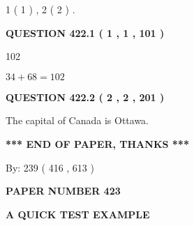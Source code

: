 \documentclass[12pt]{article}
\begin{document}
   
   1 ( 1 )
 ,
   2 ( 2 )
 .
  
\vspace{0.2in}
  
{\textbf{\Large{QUESTION
422.1 
 ( 1 , 1 , 101 )
}}}
  
  
 
 
\noindent{}

102
 
 
 
 
\noindent{}

$ %
34 +  %
68=   %
102$
 
 
  
\vspace{0.2in}
  
{\textbf{\Large{QUESTION
422.2 
 ( 2 , 2 , 201 )
}}}
  
  
 
 
\noindent{}
 
 
The capital of Canada is Ottawa.
 
 
 
 
   
   
 \vspace{0.2in}
 
   
   
   
   
\vspace{1.0in} 
{\textbf{\large{ *** END OF PAPER, THANKS *** }}} 
   
   
\hspace{1.0in} By: 
 239 ( 416 ,  613 )
   
   
   
   
\newpage 
\setcounter{page}{ 
   423001 } 
   
   
   
   
 {\textbf{ \Large{ PAPER NUMBER  423  }}}
   
   
\vspace{0.2in}
   
   
   
   
   
   
 \vspace{0.2in}
{\LARGE {\textbf{ A QUICK TEST EXAMPLE}}}
   
\end{document}
